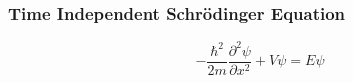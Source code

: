 \documentclass[letterpaper,landscape,10pt]{article}
\newenvironment{titemize}
{\begin{list}{$\cdot$}{\leftmargin=1em}
	\setlength{\itemsep}{0pt}
	\setlength{\parskip}{0pt}
	\setlength{\parsep}{0pt}}
{\end{list}}
\begin{document}
{\begin{multicols}{4}
  \subsubsection*{Time Independent Schr\"odinger Equation}
  	$$ -\frac{\hbar^2}{2m}\frac{\partial^2\psi}{\partial x^2} + V\psi = E\psi$$

\end{multicols}}
\end{document}
